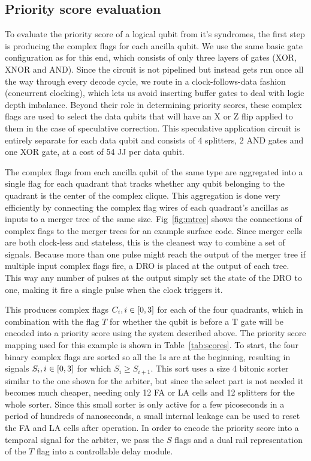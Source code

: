 \subsection{Priority score evaluation}

To evaluate the priority score of a logical qubit from it's syndromes, the first step is producing the complex flags for each ancilla qubit.
We use the same basic gate configuration as \cite{btwc} for this end, which consists of only three layers of gates (XOR, XNOR and AND). 
Since the circuit is not pipelined but instead gets run once all the way through every decode cycle, we route in a clock-follows-data fashion (concurrent clocking), which lets us avoid inserting buffer gates to deal with logic depth imbalance.
Beyond their role in determining priority scores, these complex flags are used to select the data qubits that will have an X or Z flip applied to them in the case of speculative correction.
This speculative application circuit is entirely separate for each data qubit and consists of 4 splitters, 2 AND gates and one XOR gate, at a cost of 54 JJ per data qubit.

The complex flags from each ancilla qubit of the same type are aggregated into a single flag for each quadrant that tracks whether any qubit belonging to the quadrant is the center of the complex clique.
This aggregation is done very efficiently by connecting the complex flag wires of each quadrant's ancillas as inputs to a merger tree of the same size.
Fig~\ref{fig:mtree} shows the connections of complex flags to the merger trees for an example surface code.
Since merger cells are both clock-less and stateless, this is the cleanest way to combine a set of signals.
Because more than one pulse might reach the output of the merger tree if multiple input complex flags fire, a DRO is placed at the output of each tree.
This way any number of pulses at the output simply set the state of the DRO to one, making it fire a single pulse when the clock triggers it.

This produces complex flags $C_i, i \in \interval{0}{3}$ for each of the four quadrants, which in combination with the flag $T$ for whether the qubit is before a T gate will be encoded into a priority score using the system described above.
The priority score mapping used for this example is shown in Table~\ref{tab:scores}.
To start, the four binary complex flags are sorted so all the 1s are at the beginning, resulting in signals $S_i, i \in \interval{0}{3}$ for which $S_{i} \ge S_{i+1}$.
This sort uses a size 4 bitonic sorter similar to the one shown for the arbiter, but since the select part is not needed it becomes much cheaper, needing only 12 FA or LA cells and 12 splitters for the whole sorter.
Since this small sorter is only active for a few picoseconds in a period of hundreds of nanoseconds, a small internal leakage can be used to reset the FA and LA cells after operation.
In order to encode the priority score into a temporal signal for the arbiter, we pass the $S$ flags and a dual rail representation of the $T$ flag into a controllable delay module.

